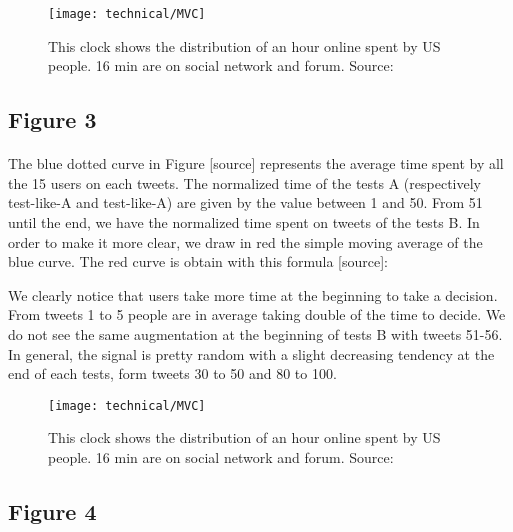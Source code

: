 \begin{figure}[h] 
\centering 
\texttt{[image: technical/MVC]} 
\caption[Time spent of Social Media]{This clock shows the distribution of an hour online spent by US people. 16 min are on social network and forum. Source: \cite{s_clock}}
\label{fig:tinder} 
\end{figure}

\subsection{Figure 3}

\paragraph{}
The blue dotted curve in Figure [source] represents the average time spent by all the 15 users on each tweets. The normalized time of the tests A (respectively test-like-A and test-like-A) are given by the value between 1 and 50. From 51 until the end, we have the normalized time spent on tweets of the tests B.
In order to make it more clear, we draw in red the simple moving average of the blue curve. The red curve is obtain with this formula [source]:


We clearly notice that users take more time at the beginning to take a decision. From tweets 1 to 5 people are in average taking double of the time to decide. We do not see  the same augmentation at the beginning of tests B with tweets 51-56.\\
In general, the signal is pretty random with a slight decreasing tendency at the end of each tests, form tweets 30 to 50 and 80 to 100.

\begin{figure}[h] 
\centering 
\texttt{[image: technical/MVC]} 
\caption[Time spent of Social Media]{This clock shows the distribution of an hour online spent by US people. 16 min are on social network and forum. Source: \cite{s_clock}}
\label{fig:tinder} 
\end{figure}


\subsection{Figure 4}

